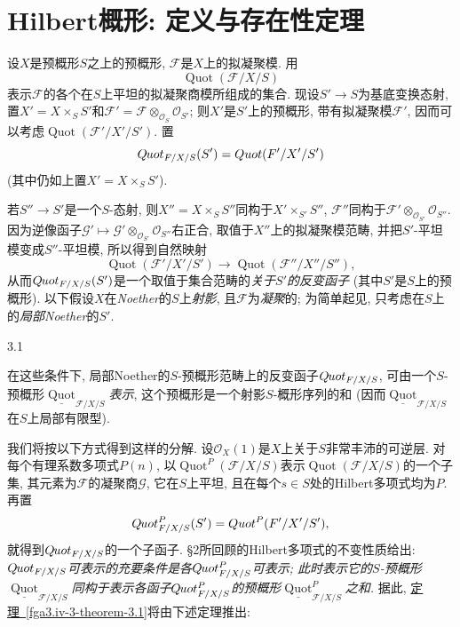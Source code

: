 \chapter{Hilbert概形: 定义与存在性定理}\thispagestyle{fancy}\label{fga3.iv-3}
\par{}设\(X\)是预概形\(S\)之上的预概形, \(\mathscr {F}\)是\(X\)上的拟凝聚模. 用\[     \operatorname {Quot}({\mathscr {F}/X/S})   \]表示\(\mathscr {F}\)的各个在\(S\)上平坦的拟凝聚商模所组成的集合. 现设\(S'\to  S\)为基底变换态射, 置\(X'=X\times _S S'\)和\(\mathscr {F}'=\mathscr {F}\otimes _{\mathcal {O}_S}\mathcal {O}_{S'}\); 则\(X'\)是\(S'\)上的预概形, 带有拟凝聚模\(\mathscr {F}'\), 因而可以考虑\(\operatorname {Quot}({\mathscr {F}'/X'/S'})\). 置\[     \mathscr {Q}\kern  -.75pt\mathit {uot}_{{\mathscr {F}/X/S}} (S')     = \operatorname {Quot}({\mathscr {F}'/X'/S'})   \] (其中仍如上置\(X'=X\times _S S'\)).
\par{}若\(S''\to  S'\)是一个\(S\)-态射, 则\(X''=X\times _S S''\)同构于\(X'\times _{S'}S''\), \(\mathscr {F}''\)同构于\(\mathscr {F}'\otimes _{\mathcal {O}_{S'}}\mathcal {O}_{S''}\). 因为逆像函子\(\mathscr {G}'\mapsto \mathscr {G}'\otimes _{\mathcal {O}_{S'}}\mathcal {O}_{S''}\)右正合, 取值于\(X''\)上的拟凝聚模范畴, 并把\(S'\)-平坦模变成\(S''\)-平坦模, 所以得到自然映射\[     \operatorname {Quot}({\mathscr {F}'/X'/S'}) \to  \operatorname {Quot}(\mathscr {F}''/X''/S''),\] 从而\(\mathscr {Q}\kern  -.75pt\mathit {uot}_{{\mathscr {F}/X/S}} (S')\)是一个取值于集合范畴的\emph{关于\(S'\)的反变函子} (其中\(S'\)是\(S\)上的预概形). 以下假设\(X\)在\emph{Noether}的\(S\)上\emph{射影}, 且\(\mathscr {F}\)为\emph{凝聚}的; 为简单起见, 只考虑在\(S\)上的\emph{局部Noether}的\(S'\).
\begin{theorem}{3.1}\label{fga3.iv-3-theorem-3.1}\skipsinglepar
\par{}在这些条件下, 局部Noether的\(S\)-预概形范畴上的反变函子\(\mathscr {Q}\kern  -.75pt\mathit {uot}_{{\mathscr {F}/X/S}}\), 可由一个\(S\)-预概形\(\underline {\operatorname {Quot}}_{{\mathscr {F}/X/S}}\)\emph{表示}, 这个预概形是一个射影\(S\)-概形序列的和 (因而\(\underline {\operatorname {Quot}}_{{\mathscr {F}/X/S}}\)在\(S\)上局部有限型).
\end{theorem}
\par{}我们将按以下方式得到这样的分解. 设\(\mathcal {O}_X(1)\)是\(X\)上关于\(S\)非常丰沛的可逆层. 对每个有理系数多项式\(P(n)\), 以\(\operatorname {Quot}^P({\mathscr {F}/X/S})\)表示\(\operatorname {Quot}({\mathscr {F}/X/S})\)的一个子集, 其元素为\(\mathscr {F}\)的凝聚商\(\mathscr {G}\), 它在\(S\)上平坦, 且在每个\(s\in  S\)处的Hilbert多项式均为\(P\). 再置\[     \mathscr {Q}\kern  -.75pt\mathit {uot}_{\mathscr {F}/X/S}^P(S')     = \operatorname {Quot}^P({\mathscr {F}'/X'/S'}),\] 就得到\(\mathscr {Q}\kern  -.75pt\mathit {uot}_{\mathscr {F}/X/S}\)的一个子函子. §2所回顾的Hilbert多项式的不变性质给出: \emph{\(\mathscr {Q}\kern  -.75pt\mathit {uot}_{\mathscr {F}/X/S}\)可表示的充要条件是各\(\mathscr {Q}\kern  -.75pt\mathit {uot}_{\mathscr {F}/X/S}^P\)可表示; 此时表示它的\(S\)-预概形\(\underline {\operatorname {Quot}}_{{\mathscr {F}/X/S}}\)同构于表示各函子\(\mathscr {Q}\kern  -.75pt\mathit {uot}_{\mathscr {F}/X/S}^P\)的预概形\(\underline {\operatorname {Quot}}_{{\mathscr {F}/X/S}}^P\)之和.} 据此, \hyperref[fga3.iv-3-theorem-3.1]{定理~\ref*{fga3.iv-3-theorem-3.1}}将由下述定理推出:
